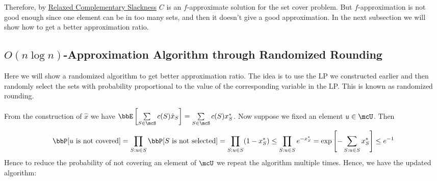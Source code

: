 Therefore, by \hyperref[th:relaxed-cs]{Relaxed Complementary Slackness} $C$ is an $f$-approximate solution for the set cover problem. But $f$-approximation is not good enough since one element can be in too many sets, and then it doesn't give a good approximation. In the next subsection we will show how to get a better approximation ratio.


\subsection{\texorpdfstring{$O(n\log n)$}{O(nlogn)}-Approximation Algorithm through Randomized Rounding}
Here we will show a randomized algorithm to get better approximation ratio. The idea is to use the LP we constructed earlier and then randomly select the sets with probability proportional to the value of the corresponding variable in the LP. This is known as randomized rounding.

\begin{algorithm}\DontPrintSemicolon
	\caption{$O(n\log n)$-Approximate Algorithm}
\end{algorithm}\parinf

From the construction of $\hat{x}$ we have $\bbE\lt[\sum\limits_{S\in\mcS}c(S)\hat{x}_S\rt]=\sum\limits_{S\in\mcS}c(S)x^*_S$. Now suppose we fixed an element $u\in\mcU$. Then $$\bbP[u \text{ is not covered}]=\prod\limits_{S:u\in S}\bbP[S\text{ is not selected}]=\prod\limits_{S:u\in S}(1-x^*_S)\leq \prod_{S:u\in S}e^{-x^*_S}=\exp\lt[-\sum\limits_{S:u\in S}x^*_S\rt]\leq e^{-1}$$Hence to reduce the probability of not covering an element of $\mcU$ we repeat the algorithm multiple times. Hence, we have the updated algorithm:
\begin{algorithm}\DontPrintSemicolon
	\caption{$O(n\log n)$-Approximate Algorithm}
\end{algorithm}\parinn

